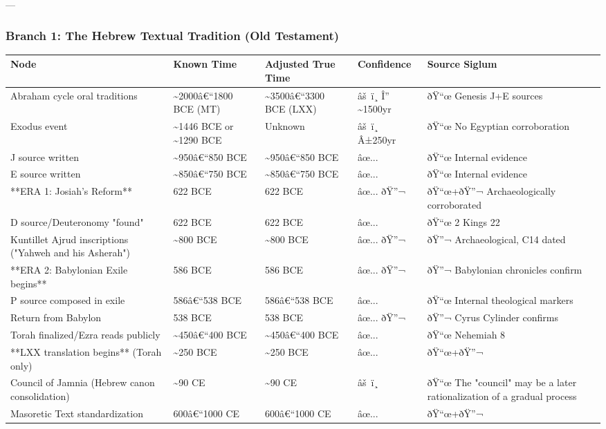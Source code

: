 \documentclass[aps,prd,11pt,onecolumn,superscriptaddress,nofootinbib,floatfix]{revtex4-2}
\begin{document}
---


\subsubsection{Branch 1: The Hebrew Textual Tradition (Old Testament)}


\begin{table}[h!]
\centering
\begin{tabular}{p{3cm}p{3cm}p{3cm}p{3cm}p{3cm}}
\hline
Node & Known Time & Adjusted True Time & Confidence & Source Siglum \\
\hline
Abraham cycle oral traditions & \textasciitilde{}2000â€``1800 BCE (MT) & \textasciitilde{}3500â€``3300 BCE (LXX) & âš ï¸ Î'' \textasciitilde{}1500yr & ðŸ``œ Genesis J+E sources \\
Exodus event & \textasciitilde{}1446 BCE or \textasciitilde{}1290 BCE & Unknown & âš ï¸ Â±250yr & ðŸ``œ No Egyptian corroboration \\
J source written & \textasciitilde{}950â€``850 BCE & \textasciitilde{}950â€``850 BCE & âœ... & ðŸ``œ Internal evidence \\
E source written & \textasciitilde{}850â€``750 BCE & \textasciitilde{}850â€``750 BCE & âœ... & ðŸ``œ Internal evidence \\
**ERA 1: Josiah's Reform** & 622 BCE & 622 BCE & âœ... ðŸ''¬ & ðŸ``œ+ðŸ''¬ Archaeologically corroborated \\
D source/Deuteronomy "found" & 622 BCE & 622 BCE & âœ... & ðŸ``œ 2 Kings 22 \\
Kuntillet Ajrud inscriptions ("Yahweh and his Asherah") & \textasciitilde{}800 BCE & \textasciitilde{}800 BCE & âœ... ðŸ''¬ & ðŸ''¬ Archaeological, C14 dated \\
**ERA 2: Babylonian Exile begins** & 586 BCE & 586 BCE & âœ... ðŸ''¬ & ðŸ''¬ Babylonian chronicles confirm \\
P source composed in exile & 586â€``538 BCE & 586â€``538 BCE & âœ... & ðŸ``œ Internal theological markers \\
Return from Babylon & 538 BCE & 538 BCE & âœ... ðŸ''¬ & ðŸ''¬ Cyrus Cylinder confirms \\
Torah finalized/Ezra reads publicly & \textasciitilde{}450â€``400 BCE & \textasciitilde{}450â€``400 BCE & âœ... & ðŸ``œ Nehemiah 8 \\
**LXX translation begins** (Torah only) & \textasciitilde{}250 BCE & \textasciitilde{}250 BCE & âœ... & ðŸ``œ+ðŸ''¬ \\
Council of Jamnia (Hebrew canon consolidation) & \textasciitilde{}90 CE & \textasciitilde{}90 CE & âš ï¸ & ðŸ``œ The "council" may be a later rationalization of a gradual process \\
Masoretic Text standardization & 600â€``1000 CE & 600â€``1000 CE & âœ... & ðŸ``œ+ðŸ''¬ \\
\hline
\end{tabular}
\end{table}
\end{document}
